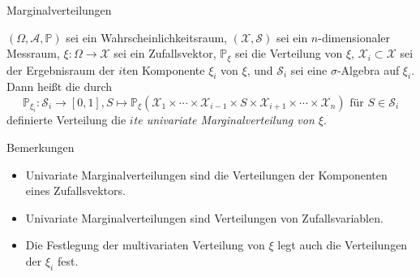 \documentclass[
  8pt,
  ignorenonframetext,
]{beamer}
\providecommand{\tightlist}{%
  \setlength{\itemsep}{0pt}\setlength{\parskip}{0pt}}
\begin{document}
\begin{frame}{Marginalverteilungen}
\protect\hypertarget{marginalverteilungen}{}
\small
\begin{definition}
\justifying
$(\Omega, \mathcal{A}, \mathbb{P})$ sei ein Wahrscheinlichkeitsraum, 
$(\mathcal{X}, \mathcal{S})$ sei ein $n$-dimensionaler Messraum, 
$\xi:\Omega \to \mathcal{X}$ sei ein Zufallsvektor, $\mathbb{P}_\xi$ sei die 
Verteilung von $\xi$, $\mathcal{X}_i \subset \mathcal{X}$ sei der Ergebnisraum der 
$i$ten Komponente $\xi_i$ von $\xi$, und $\mathcal{S}_i$ sei eine 
$\sigma$-Algebra auf $\xi_i$. Dann heißt die durch
\begin{equation}
\mathbb{P}_{\xi_i} : \mathcal{S}_i \to [0,1],
S \mapsto  \mathbb{P}_\xi\left(\mathcal{X}_1
                     \times
                     \cdots
                     \times
                     \mathcal{X}_{i-1}
                     \times S
                     \times \mathcal{X}_{i+1}
                     \times \cdots
                     \times \mathcal{X}_n\right)
\mbox{ für } S \in \mathcal{S}_i
\end{equation}
definierte Verteilung die \textit{$i$te univariate Marginalverteilung von $\xi$}.
\end{definition}

Bemerkungen

\begin{itemize}
\tightlist
\item
  \justifying Univariate Marginalverteilungen sind die Verteilungen der
  Komponenten eines Zufallsvektors.
\item
  Univariate Marginalverteilungen sind Verteilungen von
  Zufallsvariablen.
\item
  Die Festlegung der multivariaten Verteilung von \(\xi\) legt auch die
  Verteilungen der \(\xi_i\) fest.
\end{itemize}
\end{frame}
\end{document}
